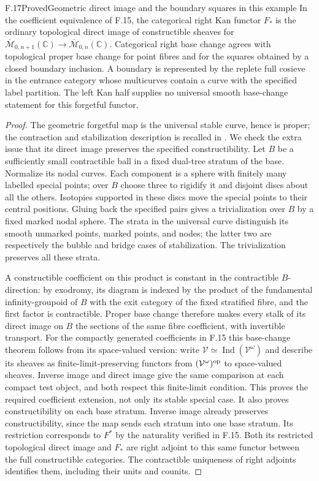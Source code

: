 \begin{claim}{F.17}{Proved}{Geometric direct image and the boundary squares in this example}
In the coefficient equivalence of F.15, the categorical right Kan functor $F_*$ is the ordinary topological direct image of constructible sheaves for
$\overline{\mathcal M}_{0,n+1}(\mathbb C)\to\overline{\mathcal M}_{0,n}(\mathbb C)$.
Categorical right base change agrees with topological proper base change for point fibres and for the squares obtained by a closed boundary inclusion. A boundary is represented by the replete full cosieve in the entrance category whose multicurves contain a curve with the specified label partition. The left Kan half supplies no universal smooth base-change statement for this forgetful functor.
\end{claim}
\begin{proof}
The geometric forgetful map is the universal stable curve, hence is proper; the contraction and stabilization description is recalled in \citet[pp.~546--548]{EFKeel1992}. We check the extra issue that its direct image preserves the specified constructibility. Let $B$ be a sufficiently small contractible ball in a fixed dual-tree stratum of the base. Normalize its nodal curves. Each component is a sphere with finitely many labelled special points; over $B$ choose three to rigidify it and disjoint discs about all the others. Isotopies supported in these discs move the special points to their central positions. Gluing back the specified pairs gives a trivialization over $B$ by a fixed marked nodal sphere. The strata in the universal curve distinguish its smooth unmarked points, marked points, and nodes; the latter two are respectively the bubble and bridge cases of stabilization. The trivialization preserves all these strata.

A constructible coefficient on this product is constant in the contractible $B$-direction: by exodromy, its diagram is indexed by the product of the fundamental infinity-groupoid of $B$ with the exit category of the fixed stratified fibre, and the first factor is contractible. Proper base change therefore makes every stalk of its direct image on $B$ the sections of the same fibre coefficient, with invertible transport. For the compactly generated coefficients in F.15 this base-change theorem follows from its space-valued version: write $\mathcal V\simeq\operatorname{Ind}(\mathcal V^\omega)$ and describe its sheaves as finite-limit-preserving functors from $(\mathcal V^\omega)^{\mathrm{op}}$ to space-valued sheaves. Inverse image and direct image give the same comparison at each compact test object, and both respect this finite-limit condition. This proves the required coefficient extension, not only its stable special case. It also proves constructibility on each base stratum. Inverse image already preserves constructibility, since the map sends each stratum into one base stratum. Its restriction corresponds to $F^*$ by the naturality verified in F.15. Both its restricted topological direct image and $F_*$ are right adjoint to this same functor between the full constructible categories. The contractible uniqueness of right adjoints identifies them, including their units and counits.


\end{proof}
